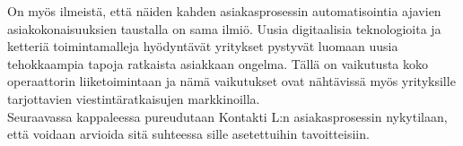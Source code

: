 \documentclass[finnish,12pt,a4paper,pdftex]{article}
\begin{document}
\noindent On myös ilmeistä, että näiden kahden asiakasprosessin automatisointia ajavien asiakokonaisuuksien taustalla on sama ilmiö. Uusia digitaalisia teknologioita ja ketteriä toimintamalleja hyödyntävät yritykset pystyvät luomaan uusia tehokkaampia tapoja ratkaista asiakkaan ongelma. Tällä on vaikutusta koko operaattorin liiketoimintaan ja nämä vaikutukset ovat nähtävissä myös yrityksille tarjottavien viestintäratkaisujen markkinoilla. \\

Seuraavassa kappaleessa pureudutaan Kontakti L:n asiakasprosessin nykytilaan, että voidaan arvioida sitä suhteessa sille asetettuihin tavoitteisiin.




\end{document}
